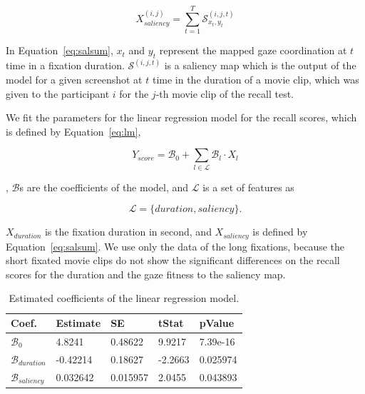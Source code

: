 \documentclass[oneside,master]{snueethesis}
\begin{document}
\begin{equation}\label{eq:salsum}
X_{saliency}^{(i,j)} = \sum_{t=1}^{T} \mathcal{S}_{x_{t},y_{t}}^{(i,j,t)}
\end{equation}

In Equation~\ref{eq:salsum}, $x_{t}$ and $y_{t}$ represent the mapped gaze coordination at $t$ time in a fixation duration. $\mathcal{S}^{(i,j,t)}$ is a saliency map which is the output of the model for a given screenshot at $t$ time in the duration of a movie clip, which was given to the participant $i$ for the $j$-th movie clip of the recall test.

We fit the parameters for the linear regression model for the recall scores, which is defined by Equation~\ref{eq:lm},

\begin{equation}\label{eq:lm}
Y_{score} = \mathcal{B}_{0} + \sum_{l \in \mathcal{L}} \mathcal{B}_{l} \cdot X_{l}
\end{equation}

\noindent, $\mathcal{B}$s are the coefficients of the model, and $\mathcal{L}$ is a set of features as  

\begin{equation}\label{eq:l}
\mathcal{L} = \{duration, saliency\}.
\end{equation}

$X_{duration}$ is the fixation duration in second, and $X_{saliency}$ is defined by Equation~\ref{eq:salsum}. We use only the data of the long fixations, because the short fixated movie clips do not show the significant differences on the recall scores for the duration and the gaze fitness to the saliency map.

\begin{table}[ht]
\begin{center} 
\caption[Estimated coefficients of the linear regression model]{Estimated coefficients of the linear regression model.}
\vskip 0.12in
\label{tab:lr-coef} 
\begin{tabular}{lllll} 
\hline
Coef. & Estimate & SE & tStat & pValue \\ 
\hline
$\mathcal{B}_{0}$    &  4.8241   &  0.48622  &  9.9217 &  7.39e-16  \\
$\mathcal{B}_{duration}$ & -0.42214  &  0.18627  & -2.2663 &  0.025974    \\
$\mathcal{B}_{saliency}$ &  0.032642 &  0.015957 &  2.0455 &  0.043893    \\
\hline
\end{tabular} 
\end{center} 
\end{table}
\end{document}
